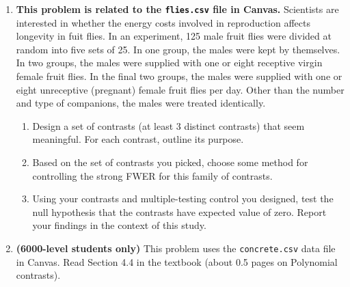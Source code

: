 \documentclass[10pt,twoside]{article}\usepackage[]{graphicx}\usepackage[dvipsnames,svgnames,table]{xcolor}
\begin{document}
\begin{enumerate}
  \begin{enumerate}
    \item Compute an analysis of variance table for these data, and test the null hypothesis that all four treatments yield the same average moisture contents with a significance level of $\alpha = 0.05$.
    \item Perform all pair-wise comparisons using Tukey's-HSD adjustment method, and report the outcome of each pairwise comparison.
    \item \textbf{(For 6000-level students):} Using an appropriate contrast, compute a $99\%$ confidence interval for the difference in response between the average of the three treatment groups (acid, pulp, and salt) and the control group. (HINT: Be very careful with the order of the \texttt{levels} of the factor variable in \texttt{R}).
  \end{enumerate}
  
  \item \textbf{This problem is related to the \texttt{flies.csv} file in Canvas.} Scientists are interested in whether the energy costs involved in reproduction affects longevity in fuit flies. In an experiment, 125 male fruit flies were divided at random into five sets of 25. In one group, the males were kept by themselves.
  In two groups, the males were supplied with one or eight receptive virgin female fruit flies.
  In the final two groups, the males were supplied with one or eight unreceptive (pregnant) female fruit flies per day. Other than the number and type of companions, the males were treated identically.
  
  \begin{enumerate}
    \item Design a set of contrasts (at least 3 distinct contrasts) that seem meaningful. For each contrast, outline its purpose.
    \item Based on the set of contrasts you picked, choose some method for controlling the strong FWER for this family of contrasts.
    \item Using your contrasts and multiple-testing control you designed, test the null hypothesis that the contrasts have expected value of zero. Report your findings in the context of this study.
  \end{enumerate}
  
  \item \label{prob:last} \textbf{(6000-level students only)} This problem uses the \texttt{concrete.csv} data file in Canvas. 
  Read Section 4.4 in the textbook (about 0.5 pages on Polynomial contrasts).
  

\end{enumerate}
\end{document}
